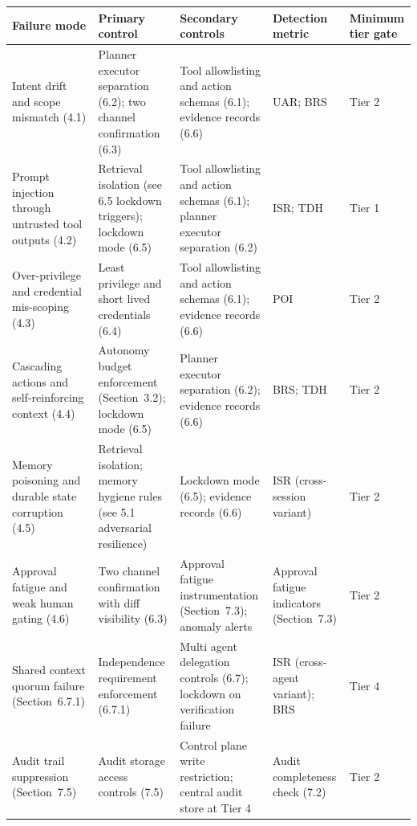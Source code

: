 \documentclass[11pt]{article}
\begin{document}
\begin{longtable}{>{\raggedright\arraybackslash}p{1.1in}>{\raggedright\arraybackslash}p{1.1in}>{\raggedright\arraybackslash}p{1.1in}>{\raggedright\arraybackslash}p{1.1in}>{\raggedright\arraybackslash}p{1.1in}}
\textbf{Failure mode} & \textbf{Primary control} & \textbf{Secondary controls} & \textbf{Detection metric} & \textbf{Minimum tier gate} \\
\hline
\endhead
Intent drift and scope mismatch (4.1) &
Planner executor separation (6.2); two channel confirmation (6.3) &
Tool allowlisting and action schemas (6.1); evidence records (6.6) &
UAR; BRS &
Tier 2 \\
\hline
Prompt injection through untrusted tool outputs (4.2) &
Retrieval isolation (see 6.5 lockdown triggers); lockdown mode (6.5) &
Tool allowlisting and action schemas (6.1); planner executor separation (6.2) &
ISR; TDH &
Tier 1 \\
\hline
Over-privilege and credential mis-scoping (4.3) &
Least privilege and short lived credentials (6.4) &
Tool allowlisting and action schemas (6.1); evidence records (6.6) &
POI &
Tier 2 \\
\hline
Cascading actions and self-reinforcing context (4.4) &
Autonomy budget enforcement (Section~3.2); lockdown mode (6.5) &
Planner executor separation (6.2); evidence records (6.6) &
BRS; TDH &
Tier 2 \\
\hline
Memory poisoning and durable state corruption (4.5) &
Retrieval isolation; memory hygiene rules (see 5.1 adversarial resilience) &
Lockdown mode (6.5); evidence records (6.6) &
ISR (cross-session variant) &
Tier 2 \\
\hline
Approval fatigue and weak human gating (4.6) &
Two channel confirmation with diff visibility (6.3) &
Approval fatigue instrumentation (Section~7.3); anomaly alerts &
Approval fatigue indicators (Section~7.3) &
Tier 2 \\
\hline
Shared context quorum failure (Section~6.7.1) &
Independence requirement enforcement (6.7.1) &
Multi agent delegation controls (6.7); lockdown on verification failure &
ISR (cross-agent variant); BRS &
Tier 4 \\
\hline
Audit trail suppression (Section~7.5) &
Audit storage access controls (7.5) &
Control plane write restriction; central audit store at Tier 4 &
Audit completeness check (7.2) &
Tier 2 \\
\hline
\end{longtable}
\end{document}
